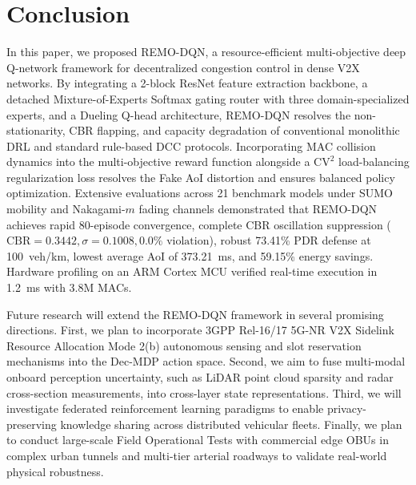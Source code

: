 \documentclass[journal]{IEEEtran}
\begin{document}
\section{Conclusion}
In this paper, we proposed REMO-DQN, a resource-efficient multi-objective deep Q-network framework for decentralized congestion control in dense V2X networks. By integrating a 2-block ResNet feature extraction backbone, a detached Mixture-of-Experts Softmax gating router with three domain-specialized experts, and a Dueling Q-head architecture, REMO-DQN resolves the non-stationarity, CBR flapping, and capacity degradation of conventional monolithic DRL and standard rule-based DCC protocols. Incorporating MAC collision dynamics into the multi-objective reward function alongside a $\text{CV}^2$ load-balancing regularization loss resolves the Fake AoI distortion and ensures balanced policy optimization. Extensive evaluations across 21 benchmark models under SUMO mobility and Nakagami-$m$ fading channels demonstrated that REMO-DQN achieves rapid 80-episode convergence, complete CBR oscillation suppression ($\text{CBR}=0.3442, \sigma=0.1008, 0.0\%\text{ violation}$), robust 73.41\% PDR defense at 100~veh/km, lowest average AoI of 373.21~ms, and 59.15\% energy savings. Hardware profiling on an ARM Cortex MCU verified real-time execution in 1.2~ms with 3.8M MACs.

Future research will extend the REMO-DQN framework in several promising directions. First, we plan to incorporate 3GPP Rel-16/17 5G-NR V2X Sidelink Resource Allocation Mode 2(b) autonomous sensing and slot reservation mechanisms into the Dec-MDP action space. Second, we aim to fuse multi-modal onboard perception uncertainty, such as LiDAR point cloud sparsity and radar cross-section measurements, into cross-layer state representations. Third, we will investigate federated reinforcement learning paradigms to enable privacy-preserving knowledge sharing across distributed vehicular fleets. Finally, we plan to conduct large-scale Field Operational Tests with commercial edge OBUs in complex urban tunnels and multi-tier arterial roadways to validate real-world physical robustness.

\balance


\end{document}
